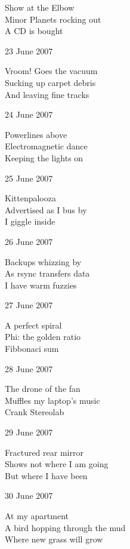 \documentclass[12pt]{article}
\begin{document}
Show at the Elbow \\
Minor Planets rocking out \\
A CD is bought

23 June 2007

Vroom! Goes the vacuum \\
Sucking up carpet debris \\
And leaving fine tracks

24 June 2007

Powerlines above \\
Electromagnetic dance \\
Keeping the lights on 

25 June 2007 

Kittenpalooza \\
Advertised as I bus by \\
I giggle inside



\newpage

26 June 2007

Backups whizzing by \\
As rsync transfers data \\
I have warm fuzzies

27 June 2007

A perfect spiral \\
Phi: the golden ratio \\
Fibbonaci sum

28 June 2007

The drone of the fan \\
Muffles my laptop's music \\
Crank Stereolab

29 June 2007

Fractured rear mirror \\
Shows not where I am going \\
But where I have been

30 June 2007

At my apartment \\
A bird hopping through the mud \\
Where new grass will grow


\newpage
\end{document}

